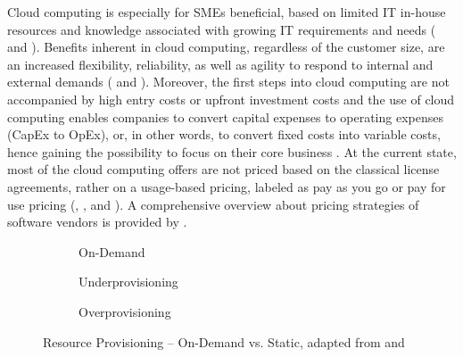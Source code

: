 Cloud computing is especially for \acp{SME} beneficial, based on limited IT in-house resources and knowledge associated with growing IT requirements and needs (\citealp{Karabek2011} and \citealp[p. 398]{Weinhardt2009}). Benefits inherent in cloud computing, regardless of the customer size, are an increased flexibility, reliability, as well as agility to respond to internal and external demands (\citealp[p. 51]{Vaquero2009} and \citealp[p. 129]{Iyer2010}). Moreover, the first steps into cloud computing are not accompanied by high entry costs or upfront investment costs and the use of cloud computing enables companies to convert capital expenses to operating expenses (CapEx to OpEx), or, in other words, to convert fixed costs into variable costs, hence gaining the possibility to focus on their core business \citep[pp. 51-53]{Armbrust2010}. At the current state, most of the cloud computing offers are not priced based on the classical license agreements, rather on a usage-based pricing, labeled as pay as you go or pay for use pricing (\citealp[pp. 51-53,58]{Armbrust2010}, \citealp[p. 2]{Iyer2010}, and \citealp[pp. 50-54]{Vaquero2009}). A comprehensive overview about pricing strategies of software vendors is provided by \citet{Lehmann2009}.

\begin{figure}[hb]
	\centering
	\begin{subfigure}{.75\textwidth}
		\centering
		
		\caption{On-Demand}\label{fig:rpc}
	\end{subfigure}
	\begin{subfigure}[b]{.75\textwidth}
		\centering
		
		\caption{Underprovisioning}\label{fig:rpu}
	\end{subfigure}
	\begin{subfigure}[b]{.75\textwidth}
		\centering
		
		\caption{Overprovisioning}\label{fig:rpo}
	\end{subfigure}
	\caption[Resource Provisioning -- On-Demand vs. Static]{Resource Provisioning -- On-Demand vs. Static, adapted from \citet[p. 54]{Armbrust2010} and \citet[p. 127]{Iyer2010}}
	\label{fig:rp}
\end{figure}

